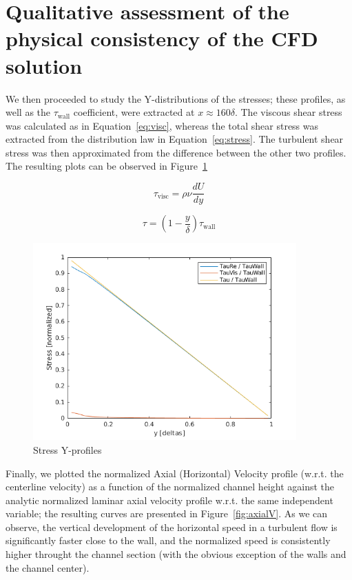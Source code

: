 \documentclass[12pt]{article}
\begin{document}
\section{Qualitative assessment of the physical consistency of the CFD solution} \label{sec:qualitative}

        We then proceeded to study the Y-distributions of the stresses; these profiles, as well as the \( \tau_{\text{wall}} \) coefficient, were extracted at \(x \approx 160 \delta\). The viscous shear stress was calculated as in Equation~\ref{eq:visc}, whereas the total shear stress was extracted from the distribution law in Equation~\ref{eq:stress}. The turbulent shear stress was then approximated from the difference between the other two profiles. The resulting plots can be observed in Figure~\ref{fig:stress}

        \begin{equation} \label{eq:visc}
                \tau_{\text{visc}} = \rho \nu \frac{dU}{dy}
        \end{equation}

        \begin{equation} \label{eq:stress}
                \tau = (1 - \frac{y}{\delta}) \tau_{\text{wall}}
        \end{equation}

        \begin{figure}[ht!]
                \centering
                \includegraphics[width=0.9\textwidth]{stress.png}
                \caption{Stress Y-profiles}
                \label{fig:stress}
        \end{figure}

        Finally, we plotted the normalized Axial (Horizontal) Velocity profile (w.r.t. the centerline velocity) as a function of the normalized channel height against the analytic normalized laminar axial velocity profile w.r.t. the same independent variable; the resulting curves are presented in Figure~\ref{fig:axialV}. As we can observe, the vertical development of the horizontal speed in a turbulent flow is significantly faster close to the wall, and the normalized speed is consistently higher throught the channel section (with the obvious exception of the walls and the channel center).
\end{document}
